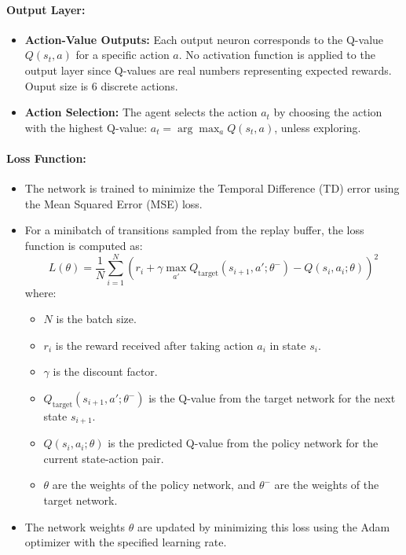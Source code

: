 \documentclass[
12pt, %
oneside, %
english, %
onehalfspacing, %
nolistspacing, %
liststotoc, %
headsepline, %
]{ProposalAndThesis} %
\begin{document}
\paragraph{Output Layer:} 
\begin{itemize}
    \item \textbf{Action-Value Outputs:} Each output neuron corresponds to the Q-value \( Q(s_t, a) \) for a specific action \( a \). No activation function is applied to the output layer since Q-values are real numbers representing expected rewards. Ouput size is 6 discrete actions.
    \item \textbf{Action Selection:} The agent selects the action \( a_t \) by choosing the action with the highest Q-value: \( a_t = \arg\max_a Q(s_t, a) \), unless exploring.

\end{itemize}

\paragraph{Loss Function:}
\begin{itemize}
    \item The network is trained to minimize the Temporal Difference (TD) error using the Mean Squared Error (MSE) loss.
    \item For a minibatch of transitions sampled from the replay buffer, the loss function is computed as:
    \[
    L(\theta) = \frac{1}{N} \sum_{i=1}^{N} \left( r_i + \gamma \max_{a'} Q_{\text{target}}(s_{i+1}, a'; \theta^-) - Q(s_i, a_i; \theta) \right)^2
    \]
    where:
    \begin{itemize}
        \item \( N \) is the batch size.
        \item \( r_i \) is the reward received after taking action \( a_i \) in state \( s_i \).
        \item \( \gamma \) is the discount factor.
        \item \( Q_{\text{target}}(s_{i+1}, a'; \theta^-) \) is the Q-value from the target network for the next state \( s_{i+1} \).
        \item \( Q(s_i, a_i; \theta) \) is the predicted Q-value from the policy network for the current state-action pair.
        \item \( \theta \) are the weights of the policy network, and \( \theta^- \) are the weights of the target network.
    \end{itemize}
    \item The network weights \( \theta \) are updated by minimizing this loss using the Adam optimizer with the specified learning rate.
\end{itemize}
\end{document}
